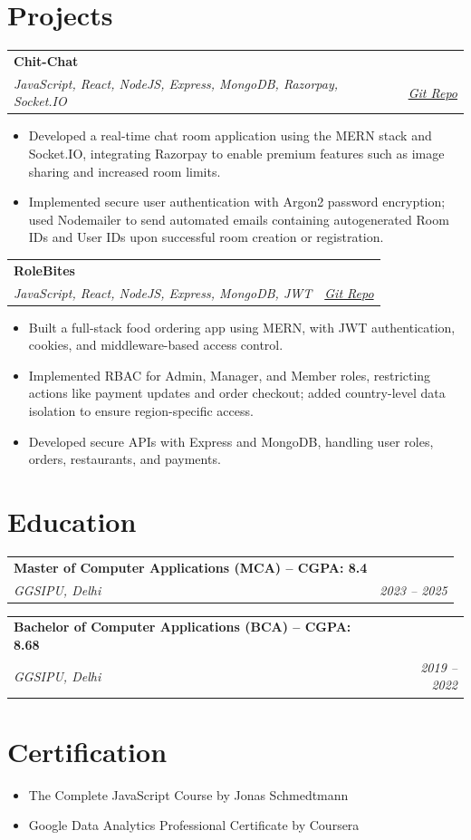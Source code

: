 \documentclass[10pt,letterpaper]{article}
\makeatletter
\newcommand{\resumeEntry}[4]{%
  \begin{tabularx}{\textwidth}{@{}Xr@{}}
    \textbf{#1} & \textbf{#4} \\
    \textit{#2} & \textit{#3}
  \end{tabularx}
}
\makeatother
\begin{document}
\section{Projects}
\resumeEntry{Chit-Chat}{JavaScript, React, NodeJS, Express, MongoDB, Razorpay, Socket.IO}{\href{https://github.com/bharatbisht825/chatRoom}{Git Repo}}{}
\begin{itemize}
  \item Developed a real-time chat room application using the MERN stack and Socket.IO, integrating Razorpay to enable premium features such as image sharing and increased room limits.
  \item Implemented secure user authentication with Argon2 password encryption; used Nodemailer to send automated emails containing autogenerated Room IDs and User IDs upon successful room creation or registration.
\end{itemize}

\resumeEntry{RoleBites}{JavaScript, React, NodeJS, Express, MongoDB, JWT}{\href{https://github.com/bharatbisht825/slooze}{Git Repo}}{}
\begin{itemize}
  \item Built a full-stack food ordering app using MERN, with JWT authentication, cookies, and middleware-based access control.
  \item Implemented RBAC for Admin, Manager, and Member roles, restricting actions like payment updates and order checkout; added country-level data isolation to ensure region-specific access.
  \item Developed secure APIs with Express and MongoDB, handling user roles, orders, restaurants, and payments.
\end{itemize}

\section{Education}
\resumeEntry{Master of Computer Applications (MCA) -- CGPA: 8.4}{GGSIPU, Delhi}{2023 -- 2025}{}
\resumeEntry{Bachelor of Computer Applications (BCA) -- CGPA: 8.68}{GGSIPU, Delhi}{2019 -- 2022}{}

\section{Certification}
\begin{itemize}
  \item The Complete JavaScript Course by Jonas Schmedtmann
  \item Google Data Analytics Professional Certificate by Coursera
\end{itemize}
\end{document}
